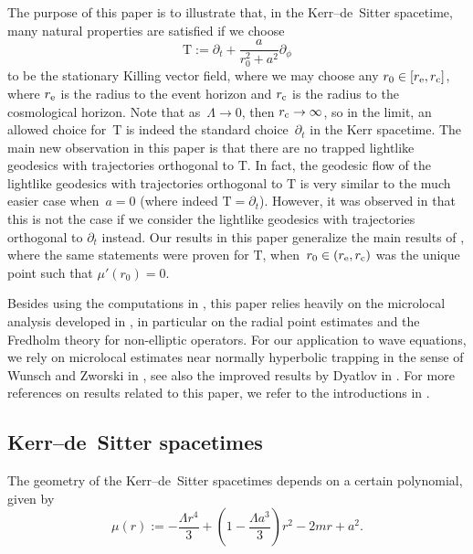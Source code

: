 \documentclass[10pt,a4paper]{amsart}
\renewcommand{\d}{\partial}
\newcommand{\T}{\mathrm T}
\numberwithin{equation}{section}
\begin{document}
The purpose of this paper is to illustrate that, in the Kerr--de~Sitter spacetime, many natural properties are satisfied if we choose
\[
	\T
		:= \d_t + \frac a{r_0^2 + a^2}\d_\phi
\]
to be the stationary Killing vector field, where we may choose any $r_0 \in [r_{\rm e}, r_{\rm c}]$,
where $r_{\rm e}$ is the radius to the event horizon and $r_{\rm c}$ is the radius to the cosmological horizon.
Note that as~${\Lambda \to 0}$, then $r_{\rm c} \to \infty$, so in the limit, an allowed choice for~$\T$ is indeed the standard choice~$\d_t$ in the Kerr spacetime.
The main new observation in this paper is that there are no trapped lightlike geodesics with trajectories orthogonal to $\T$.
In fact, the geodesic flow of the lightlike geodesics with trajectories orthogonal to $\T$ is very similar to the much easier case when~${a = 0}$ (where indeed $\T = \d_t$).
However, it was observed in \cite[p.~486]{V2013} that this is not the case if we consider the lightlike geodesics with trajectories orthogonal to $\d_t$ instead.
Our results in this paper generalize the main results of \cite{PV2023}, where the same statements were proven for $\T$, when~${r_0 \in (r_{\rm e}, r_{\rm c})}$ was the unique point such that $\mu'(r_0)= 0$.


Besides using the computations in \cite{PV2023}, this paper relies heavily on the microlocal analysis developed in \cite{V2013}, in particular on the radial point estimates and the Fredholm theory for non-elliptic operators.
For our application to wave equations, we rely on microlocal estimates near normally hyperbolic trapping in the sense of Wunsch and Zworski in \cite{WZ2011}, see also the improved results by Dyatlov in \cite{Dya2015, Dya2015b, Dya2016}.
For more references on results related to this paper, we refer to the introductions in \cite{PV2023,PV2021}.


\subsection{Kerr--de~Sitter spacetimes}
The geometry of the Kerr--de~Sitter spacetimes depends on a certain polynomial, given by
\begin{equation} \label{eq: mu}
	\mu(r)
		:= - \frac{\Lambda r^4}3 + \left( 1 - \frac{\Lambda a^3}3 \right) r^2 - 2mr + a^2.
\end{equation}
\end{document}
